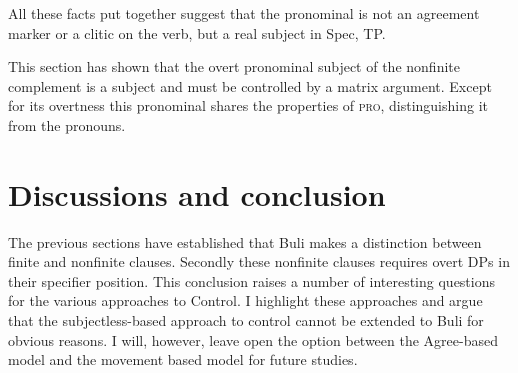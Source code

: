 \documentclass[output=paper,colorlinks,citecolor=brown]{langscibook}
\begin{document}
All these facts put together suggest that the pronominal is not an agreement marker or a clitic on the verb, but a real subject in Spec, TP. 

This section has shown that the overt pronominal subject of the nonfinite complement is a subject and must be controlled by a matrix argument. Except for its overtness  this pronominal shares the properties of \textsc{pro}, distinguishing it from the pronouns. 
%

\section{Discussions and conclusion}\label{sec:sulemana:6}

The previous sections have established that Buli makes a distinction between finite and nonfinite clauses. Secondly these nonfinite clauses requires overt DPs in their specifier position. This conclusion raises a number of interesting questions for the various approaches to Control. I highlight these approaches and argue that the subjectless-based approach to  control cannot be extended to Buli for obvious reasons. I will, however, leave open the option between the Agree-based model and the movement based model for future studies. 
\end{document}
